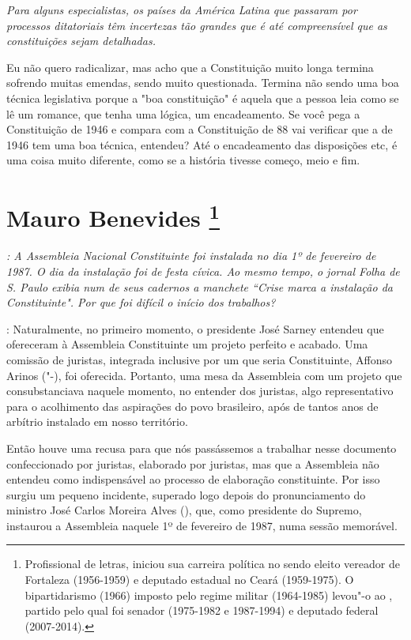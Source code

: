 \medskip

\emph{Para alguns especialistas, os países da América Latina que
passaram por processos ditatoriais têm incertezas tão grandes que é até
compreensível que as constituições sejam detalhadas.}

Eu não quero radicalizar, mas acho que a Constituição
muito longa termina sofrendo muitas emendas, sendo muito questionada.
Termina não sendo uma boa técnica legislativa porque a "boa
constituição" é aquela que a pessoa leia como se lê um romance, que
tenha uma lógica, um encadeamento. Se você pega a Constituição de 1946 e
compara com a Constituição de 88 vai verificar que a de 1946 tem uma boa
técnica, entendeu? Até o encadeamento das disposições etc, é uma coisa
muito diferente, como se a história tivesse começo, meio e fim.

\chapter{Mauro Benevides
\footnote{Profissional de letras, iniciou sua carreira política no  sendo
eleito vereador de Fortaleza (1956-1959) e deputado estadual no Ceará
(1959-1975). O bipartidarismo (1966) imposto pelo regime militar
(1964-1985) levou"-o ao , partido pelo qual foi senador (1975-1982 e
1987-1994) e deputado federal (2007-2014).}}

\emph{: A Assembleia Nacional Constituinte foi instalada no dia 1º de
fevereiro de 1987. O dia da instalação foi de festa cívica. Ao mesmo
tempo, o jornal Folha de S. Paulo exibia num de seus cadernos a manchete
``Crise marca a instalação da Constituinte". Por que foi difícil o
início dos trabalhos?}

: Naturalmente, no primeiro momento, o presidente José
Sarney entendeu que ofereceram à Assembleia Constituinte um projeto
perfeito e acabado. Uma comissão de juristas, integrada inclusive por um
que seria Constituinte, Affonso Arinos ("-), foi oferecida.
Portanto, uma mesa da Assembleia com um projeto que consubstanciava
naquele momento, no entender dos juristas, algo representativo para o
acolhimento das aspirações do povo brasileiro, após de tantos anos de
arbítrio instalado em nosso território.

Então houve uma recusa para que nós passássemos a trabalhar nesse
documento confeccionado por juristas, elaborado por juristas, mas que a
Assembleia não entendeu como indispensável ao processo de elaboração
constituinte. Por isso surgiu um pequeno incidente, superado logo depois
do pronunciamento do ministro José Carlos Moreira Alves (), que, como
presidente do Supremo, instaurou a Assembleia naquele 1º de fevereiro de
1987, numa sessão memorável.

